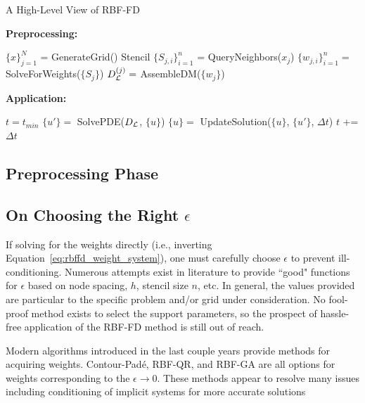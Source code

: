 \documentclass[11pt]{report}
\begin{document}
{\begin{algorithm}                      
\caption{A High-Level View of RBF-FD}          
\label{alg:rbffd_high_level}                           
\textbf{Preprocessing:}
\begin{algorithmic}[0]                   
    \State $\{x\}_{j=1}^N$ = GenerateGrid()
   	 \label{alg:stencil_gen} 
   	    \State Stencil $\{S_{j,i}\}_{i=1}^{n}$ = QueryNeighbors($x_j$)
   	\EndFor
     \label{alg:weight_calc} 
   	    \State $\{w_{j,i}\}_{i=1}^{n} = $ SolveForWeights($\{S_j\}$)
   	    \State $D_{\mathcal{L}}^{(j)} = $ AssembleDM($\{w_j\}$)     
    \EndFor
\end{algorithmic}
\textbf{Application:}
\begin{algorithmic}[1] 
    \State $t = t_{min}$                
        \State $\{u'\} =$ SolvePDE($D_{\mathcal{L}}$, $\{u\}$)
        \State $\{u\} =$ UpdateSolution($\{u\}$, $\{u'\}$, $\Delta t$)
        \State $t$ += $\Delta t$
    \EndWhile
\end{algorithmic}
\end{algorithm}



\subsection{Preprocessing Phase} 


\subsection{On Choosing the Right $\epsilon$} 


If solving for the weights directly (i.e., inverting Equation~\ref{eq:rbffd_weight_system}), one must carefully choose $\epsilon$ to prevent ill-conditioning. Numerous attempts exist in literature to provide ``good" functions for $\epsilon$ based on node spacing, $h$, stencil size $n$, etc. In general, the values provided are particular to the specific problem and/or grid under consideration. No fool-proof method exists to select the support parameters, so the prospect of hassle-free application of the RBF-FD method is still out of reach. 

Modern algorithms introduced in the last couple years provide methods for acquiring weights. Contour-Pad\'{e}, RBF-QR, and RBF-GA are all options for weights corresponding to the $\epsilon \rightarrow 0$. These methods appear to resolve many issues including conditioning of implicit systems for more accurate solutions \cite{Davydov2011}  \cite{Fornberg2013} 

}
\end{document}
